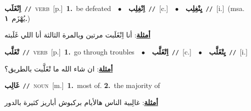 \documentclass[10pt,a4paper,twoside]{article} %
\begin{document}
\begin{multicols}{2}
{\setlength\topsep{0pt}\textbf{\foreignlanguage{arabic}{اِنْغَلَب}}\ {\color{gray}\texttt{//}\color{black}}\ \textsc{verb}\ [p.]\ \textbf{1.}~be defeated\ \ $\bullet$\ \ \setlength\topsep{0pt}\textbf{\foreignlanguage{arabic}{اِنْغِلِب}}\ {\color{gray}\texttt{//}\color{black}}\ [c.]\ \ $\bullet$\ \ \setlength\topsep{0pt}\textbf{\foreignlanguage{arabic}{يِنْغِلِب}}\ {\color{gray}\texttt{//}\color{black}}\ [i.]\ \color{gray}(msa. \foreignlanguage{arabic}{يُهْزَم}~\foreignlanguage{arabic}{\textbf{١.}})\color{black}\  \begin{flushright}\color{gray}\foreignlanguage{arabic}{\textbf{\underline{\foreignlanguage{arabic}{أمثلة}}}: أنا اِنْغَلَبت مرتين وبالمرة الثالثة أنا اللي غَلَبته}\end{flushright}\color{black}} \vspace{2mm}

{\setlength\topsep{0pt}\textbf{\foreignlanguage{arabic}{تْغَلَّب}}\ {\color{gray}\texttt{//}\color{black}}\ \textsc{verb}\ [p.]\ \textbf{1.}~go through troubles\ \ $\bullet$\ \ \setlength\topsep{0pt}\textbf{\foreignlanguage{arabic}{اِتْغَلَّب}}\ {\color{gray}\texttt{//}\color{black}}\ [c.]\ \ $\bullet$\ \ \setlength\topsep{0pt}\textbf{\foreignlanguage{arabic}{يِتْغَلَّب}}\ {\color{gray}\texttt{//}\color{black}}\ [i.]\  \begin{flushright}\color{gray}\foreignlanguage{arabic}{\textbf{\underline{\foreignlanguage{arabic}{أمثلة}}}: ان شاء الله ما تْغَلَّبت بالطريق؟}\end{flushright}\color{black}} \vspace{2mm}

{\setlength\topsep{0pt}\textbf{\foreignlanguage{arabic}{غَالِب}}\ {\color{gray}\texttt{//}\color{black}}\ \textsc{noun}\ [m.]\ \textbf{1.}~most of.  \textbf{2.}~the majority of\  \begin{flushright}\color{gray}\foreignlanguage{arabic}{\textbf{\underline{\foreignlanguage{arabic}{أمثلة}}}: غالِبية الناس هالأيام بركبوش أباريز كثيرة بالدور}\end{flushright}\color{black}} \vspace{2mm}


\end{multicols}
\end{document}
